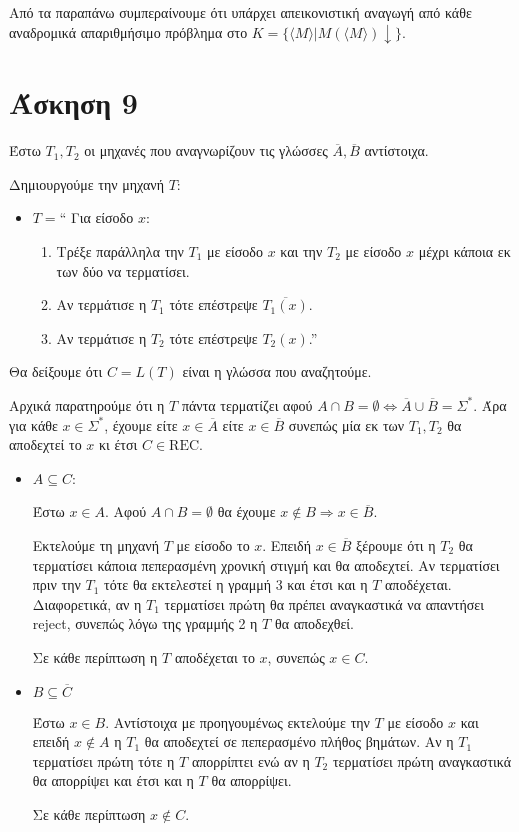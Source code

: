 \documentclass[a4paper, oneside, 11pt]{article}
\theoremstyle{definition}
\begin{document}
Από τα παραπάνω συμπεραίνουμε ότι υπάρχει απεικονιστική αναγωγή από κάθε αναδρομικά απαριθμήσιμο πρόβλημα
στο $K=\{\langle M\rangle | M(\langle M\rangle)\downarrow\}$.

\section*{Άσκηση 9}

Έστω $T_1, T_2$ οι μηχανές που αναγνωρίζουν τις γλώσσες $\overline{A}, \overline{B}$
αντίστοιχα.

Δημιουργούμε την μηχανή $T$:

\begin{itemize}
\item $T = $`` Για είσοδο $x$:
      \begin{enumerate}
         \item Τρέξε παράλληλα την $T_1$ με είσοδο $x$ και την $T_2$ με είσοδο $x$
               μέχρι κάποια εκ των δύο να τερματίσει.
         \item Αν τερμάτισε η $T_1$ τότε επέστρεψε $\overline{T_1(x)}$.
         \item Αν τερμάτισε η $T_2$ τότε επέστρεψε $T_2(x)$.''
      \end{enumerate}
\end{itemize}

Θα δείξουμε ότι $C = L(T)$ είναι η γλώσσα που αναζητούμε.

Αρχικά παρατηρούμε ότι η $T$ πάντα τερματίζει αφού $A \cap B = \emptyset
\Leftrightarrow \overline{A} \cup \overline{B} = \Sigma^*$. Άρα για κάθε $x \in
\Sigma^*$, έχουμε είτε $x \in \overline{A}$ είτε $x \in \overline{B}$ συνεπώς μία εκ
των $T_1, T_2$ θα αποδεχτεί το $x$ κι έτσι $C \in \text{REC}$.

\begin{itemize}
\item $A \subseteq C$:
      
      Έστω $x \in A$. Αφού $A \cap B = \emptyset$ θα έχουμε $x \notin B
      \Rightarrow x \in \overline{B}$.

      Εκτελούμε τη μηχανή $T$ με είσοδο το $x$. Επειδή $x \in \overline{B}$ ξέρουμε
      ότι η $T_2$ θα τερματίσει κάποια πεπερασμένη χρονική στιγμή και θα αποδεχτεί.
      Αν τερματίσει πριν την $T_1$ τότε θα εκτελεστεί η γραμμή 3 και έτσι και η $T$
      αποδέχεται. Διαφορετικά, αν η $T_1$ τερματίσει πρώτη θα
      πρέπει αναγκαστικά να απαντήσει reject, συνεπώς λόγω της γραμμής 2 η $T$ θα
      αποδεχθεί.

      Σε κάθε περίπτωση η $T$ αποδέχεται το $x$, συνεπώς $x \in C$.

\item $B \subseteq \overline{C}$

      Έστω $x \in B$. Αντίστοιχα με προηγουμένως εκτελούμε την $T$ με είσοδο $x$ και
      επειδή $x \notin A$ η $T_1$ θα αποδεχτεί σε πεπερασμένο πλήθος βημάτων. Αν η
      $T_1$ τερματίσει πρώτη τότε η $T$ απορρίπτει ενώ αν η $T_2$ τερματίσει πρώτη
      αναγκαστικά θα απορρίψει και έτσι και η $T$ θα απορρίψει.

      Σε κάθε περίπτωση $x \notin C$.
\end{itemize}
\end{document}
